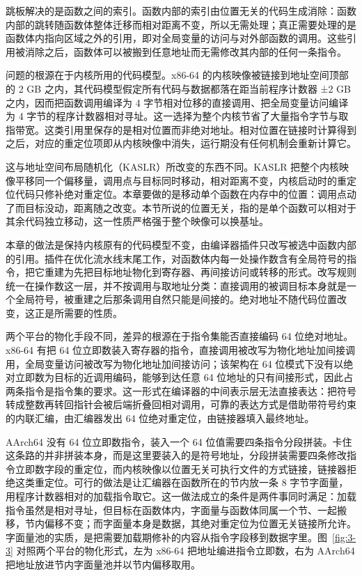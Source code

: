 跳板解决的是函数之间的索引。函数内部的索引由位置无关的代码生成消除：函数内部的跳转随函数体整体迁移而相对距离不变，所以无需处理；真正需要处理的是函数体内指向区域之外的引用，即对全局变量的访问与对外部函数的调用。这些引用被消除之后，函数体可以被搬到任意地址而无需修改其内部的任何一条指令。

问题的根源在于内核所用的代码模型。x86-64 的内核映像被链接到地址空间顶部的 2 GB 之内，其代码模型假定所有代码与数据都落在距当前程序计数器 ±2 GB 之内，因而把函数调用编译为 4 字节相对位移的直接调用、把全局变量访问编译为 4 字节的程序计数器相对寻址。这一选择为整个内核节省了大量指令字节与取指带宽。这类引用里保存的是相对位置而非绝对地址。相对位置在链接时计算得到之后，对应的重定位项即从内核映像中消失，运行期没有任何机制会重新计算它。

这与地址空间布局随机化（KASLR）所改变的东西不同。KASLR 把整个内核映像平移同一个偏移量，调用点与目标同时移动，相对距离不变，内核启动时的重定位代码只修补绝对重定位。本章要做的是移动单个函数在内存中的位置：调用点动了而目标没动，距离随之改变。本节所说的位置无关，指的是单个函数可以相对于其余代码独立移动，这一性质严格强于整个映像可以换基址。

本章的做法是保持内核原有的代码模型不变，由编译器插件只改写被选中函数内部的引用。插件在优化流水线末尾工作，对函数体内每一处操作数含有全局符号的指令，把它重建为先把目标地址物化到寄存器、再间接访问或转移的形式。改写规则统一在操作数这一层，并不按调用与取地址分类：直接调用的被调目标本身就是一个全局符号，被重建之后那条调用自然只能是间接的。绝对地址不随代码位置改变，这正是所需要的性质。

两个平台的物化手段不同，差异的根源在于指令集能否直接编码 64 位绝对地址。x86-64 有把 64 位立即数装入寄存器的指令，直接调用被改写为物化地址加间接调用，全局变量访问被改写为物化地址加间接访问；该架构在 64 位模式下没有以绝对立即数为目标的近调用编码，能够到达任意 64 位地址的只有间接形式，因此占两条指令是指令集的要求。这一形式在编译器的中间表示层无法直接表达：把符号转成整数再转回指针会被后端折叠回相对调用，可靠的表达方式是借助带符号约束的内联汇编，由汇编器发出 64 位绝对重定位，由链接器填入最终地址。

AArch64 没有 64 位立即数指令，装入一个 64 位值需要四条指令分段拼装。卡住这条路的并非拼装本身，而是这里要装入的是符号地址，分段拼装需要四条修改指令立即数字段的重定位，而内核映像以位置无关可执行文件的方式链接，链接器拒绝这类重定位。可行的做法是让汇编器在函数所在的节内放一条 8 字节字面量，用程序计数器相对的加载指令取它。这一做法成立的条件是两件事同时满足：加载指令虽然是相对寻址，但目标在函数体内，字面量与函数体同属一个节、一起搬移，节内偏移不变；而字面量本身是数据，其绝对重定位为位置无关链接所允许。字面量池的实质，是把需要加载期修补的内容从指令字段移到数据字里。图~\ref{fig:3-3} 对照两个平台的物化形式，左为 x86-64 把地址编进指令立即数，右为 AArch64 把地址放进节内字面量池并以节内偏移取用。

